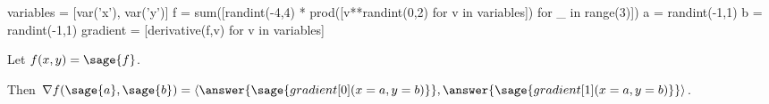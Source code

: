 \documentclass{ximera}
\author{Jim Fowler}
\begin{document}
\makerandom

\begin{sagesilent}
  variables = [var('x'), var('y')]
  f = sum([randint(-4,4) * prod([v**randint(0,2) for v in variables]) for _ in range(3)])
  a = randint(-1,1)
  b = randint(-1,1)
  gradient = [derivative(f,v) for v in variables]
\end{sagesilent}

\begin{exercise}

  Let $f(x,y) = \sage{f}$.

  Then $\nabla f(\sage{a},\sage{b}) = \langle \answer{\sage{gradient[0](x=a,y=b)}}, \answer{\sage{gradient[1](x=a,y=b)}} \rangle$.
  
\end{exercise}
\end{document}
